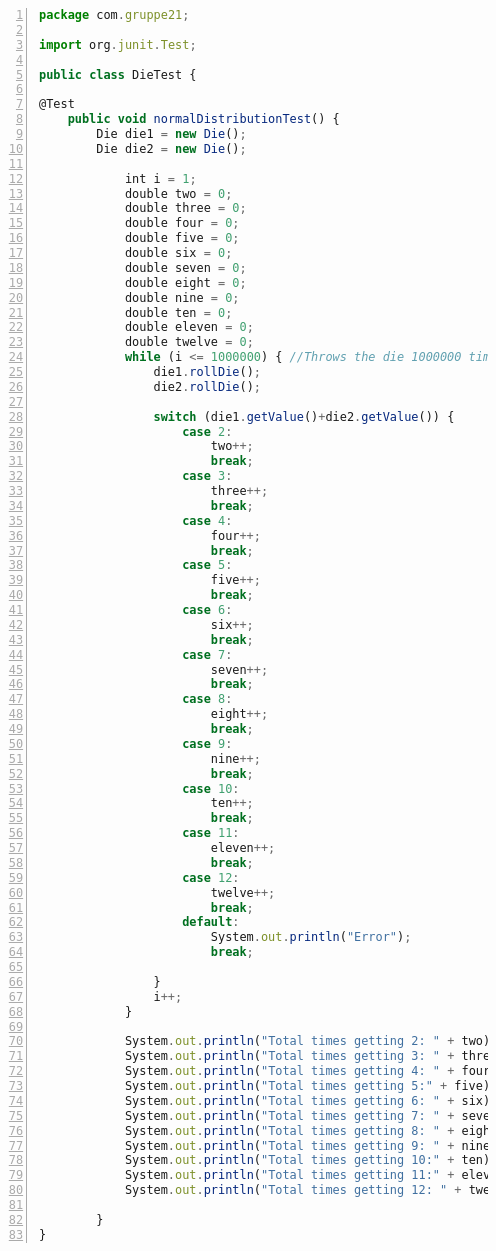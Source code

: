\begin{lstlisting}[language=JavaScript,numbers=left]
package com.gruppe21;

import org.junit.Test;

public class DieTest {

@Test
    public void normalDistributionTest() {
        Die die1 = new Die();
        Die die2 = new Die();

            int i = 1;
            double two = 0;
            double three = 0;
            double four = 0;
            double five = 0;
            double six = 0;
            double seven = 0;
            double eight = 0;
            double nine = 0;
            double ten = 0;
            double eleven = 0;
            double twelve = 0;
            while (i <= 1000000) { //Throws the die 1000000 times
                die1.rollDie();
                die2.rollDie();

                switch (die1.getValue()+die2.getValue()) {
                    case 2:
                        two++;
                        break;
                    case 3:
                        three++;
                        break;
                    case 4:
                        four++;
                        break;
                    case 5:
                        five++;
                        break;
                    case 6:
                        six++;
                        break;
                    case 7:
                        seven++;
                        break;
                    case 8:
                        eight++;
                        break;
                    case 9:
                        nine++;
                        break;
                    case 10:
                        ten++;
                        break;
                    case 11:
                        eleven++;
                        break;
                    case 12:
                        twelve++;
                        break;
                    default:
                        System.out.println("Error");
                        break;

                }
                i++;
            }

            System.out.println("Total times getting 2: " + two);
            System.out.println("Total times getting 3: " + three);
            System.out.println("Total times getting 4: " + four);
            System.out.println("Total times getting 5:" + five);
            System.out.println("Total times getting 6: " + six);
            System.out.println("Total times getting 7: " + seven);
            System.out.println("Total times getting 8: " + eight);
            System.out.println("Total times getting 9: " + nine);
            System.out.println("Total times getting 10:" + ten);
            System.out.println("Total times getting 11:" + eleven);
            System.out.println("Total times getting 12: " + twelve);

        }
}
\end{lstlisting}